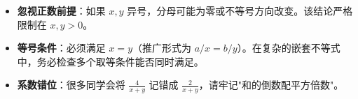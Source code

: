 \begin{trapbox}
\begin{itemize}
    \item \textbf{忽视正数前提}：如果 $x, y$ 异号，分母可能为零或不等号方向改变。该结论严格限制在 $x, y > 0$。
    \item \textbf{等号条件}：必须满足 $x=y$（推广形式为 $a/x = b/y$）。在复杂的嵌套不等式中，务必检查多个取等条件能否同时满足。
    \item \textbf{系数错位}：很多同学会将 $\frac{4}{x+y}$ 记错成 $\frac{2}{x+y}$，请牢记"和的倒数配平方倍数"。
\end{itemize}
\end{trapbox}